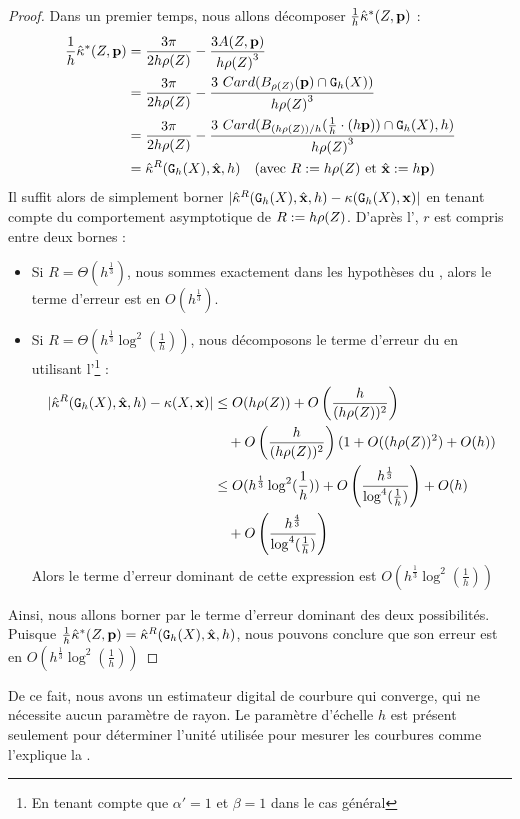 \begin{proof}
  Dans un premier temps, nous allons décomposer
  $\frac{1}{h}\hat{\kappa}^{*}(Z,\mathbf{p})$ :
  \begin{align}
    \frac{1}{h}\hat{\kappa}^{*}(Z,\mathbf{p}) &= \frac{3\pi}{2 h\rho(Z)} - \frac{3 A(Z,\mathbf{p})}{h{\rho(Z)}^3} \\
    &= \frac{3\pi}{2 h\rho(Z)} - \frac{3~ Card(B_{\rho(Z)}(\mathbf{p}) \cap \mathtt{G}_{h}(X))}{h{\rho(Z)}^3} \\
    &= \frac{3\pi}{2 h\rho(Z)} - \frac{3~ Card( B_{(h\rho(Z))/h}(\frac{1}{h} \cdot (h\mathbf{p})) \cap \mathtt{G}_{h}(X), h)}{h{\rho(Z)}^3} \\
    &= \hat{\kappa}^{R}(\mathtt{G}_{h}(X),\hat{\mathbf{x}},h)\quad \text{(avec $R := h\rho(Z)$ et $\hat{\mathbf{x}} := h\mathbf{p}$)}
  \end{align}
  Il suffit alors de simplement borner $| \hat{\kappa}^{R}(\mathtt{G}_{h}(X),\hat{\mathbf{x}},h) -
  \kappa(\mathtt{G}_{h}(X),\mathbf{x}) |$ en tenant compte du comportement asymptotique de $R :=
  h\rho(Z)$. D'après l', $r$ est
  compris entre deux bornes :
  \begin{itemize}
    \item Si $R = \Theta(h^{\frac{1}{3}})$, nous sommes exactement dans les
    hypothèses du , alors le terme d'erreur
    est en $O( h^\frac{1}{3} )$.
    \item Si $R = \Theta(h^{\frac{1}{3}} \log^2 \left(\frac{1}{h}\right))$, nous
    décomposons le terme d'erreur du  en
    utilisant l'\footnote{En
    tenant compte que $\alpha' = 1$ et $\beta = 1$ dans le cas général} :
    \begin{align}
      |\hat{\kappa}^{R}(\mathtt{G}_{h}(X),\hat{\mathbf{x}},h) - \kappa(X,\mathbf{x})| & \le O(h\rho(Z)) + O\left(\frac{h}{(h\rho(Z))^{2}}\right) \nonumber\\
      &\quad + O\left(\frac{h}{(h\rho(Z))^{2}}\right)( 1 + O((h\rho(Z))^2) + O(h)) \\
      & \le O(h^{\frac{1}{3}} \log^2 (\frac{1}{h})) + O\left(\frac{h^\frac{1}{3}}{\log^4 (\frac{1}{h})}\right) + O( h ) \nonumber\\
      &\quad + O\left(\frac{h^\frac{4}{3}}{\log^4 (\frac{1}{h})}\right)
    \end{align}
    Alors le terme d'erreur dominant de cette expression est $O(h^{\frac{1}{3}}
    \log^2 (\frac{1}{h}))$
  \end{itemize}
  Ainsi, nous allons borner par le terme d'erreur dominant des deux
  possibilités. Puisque
  $\frac{1}{h}\hat{\kappa}^{*}(Z,\mathbf{p})=\hat{\kappa}^{R}(\mathtt{G}_{h}(X),\hat{\mathbf{x}},h)$, nous pouvons
  conclure que son erreur est en $O(h^{\frac{1}{3}} \log^2 (\frac{1}{h}))$
\end{proof}
%
De ce fait, nous avons un estimateur digital de courbure qui converge, qui ne
nécessite aucun paramètre de rayon. Le paramètre d'échelle $h$ est présent
seulement pour déterminer l'unité utilisée pour mesurer les courbures comme
l'explique la .

